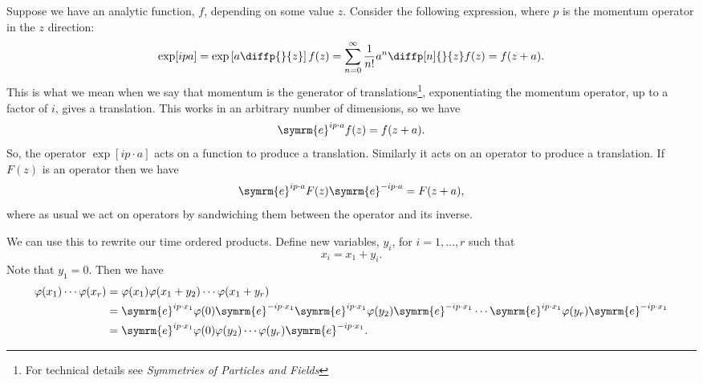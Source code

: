 \documentclass[fleqn]{NotesClass}
\newcommand*{\course}[1]{\textit{#1}}
\newcommand{\e}{\symrm{e}}
\begin{document}
    Suppose we have an analytic function, \(f\), depending on some value \(z\).
    Consider the following expression, where \(p\) is the momentum operator in the \(z\) direction:
    \begin{equation}
        \exp[ipa] = \exp\left[ a\diffp{}{z} \right] f(z) = \sum_{n = 0}^{\infty} \frac{1}{n!} a^n \diffp[n]{}{z} f(z) = f(z + a).
    \end{equation}
    This is what we mean when we say that momentum is the generator of translations\footnote{For technical details see \course{Symmetries of Particles and Fields}}, exponentiating the momentum operator, up to a factor of \(i\), gives a translation.
    This works in an arbitrary number of dimensions, so we have
    \begin{equation}
        \e^{ip \cdot a} f(z) = f(z + a).
    \end{equation}
    So, the operator \(\exp[i p \cdot a]\) acts on a function to produce a translation.
    Similarly it acts on an operator to produce a translation.
    If \(F(z)\) is an operator then we have
    \begin{equation}
        \e^{ip \cdot a} F(z) \e^{-ip\cdot a} = F(z + a),
    \end{equation}
    where as usual we act on operators by sandwiching them between the operator and its inverse.
    
    We can use this to rewrite our time ordered products.
    Define new variables, \(y_i\), for \(i = 1, \dotsc, r\) such that
    \begin{equation}
        x_i = x_1 + y_i.
    \end{equation}
    Note that \(y_1 = 0\).
    Then we have
    \begin{align}
        \varphi(x_1) \dotsm \varphi(x_r)& = \varphi(x_1) \varphi(x_1 + y_2) \dotsm \varphi(x_1 + y_r)\\
        &= \e^{ip \cdot x_1} \varphi(0) \e^{-ip\cdot x_1} \e^{ip \cdot x_1} \varphi(y_2) \e^{-ip\cdot x_1} \dotsm \e^{ip \cdot x_1} \varphi(y_r) \e^{-ip\cdot x_1}\notag\\
        &= \e^{ip \cdot x_1} \varphi(0)\varphi(y_2) \dotsm \varphi(y_r) \e^{-ip\cdot x_1}.
    \end{align}
    
\end{document}
